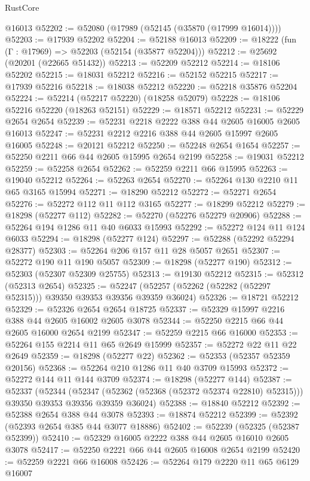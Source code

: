 \begin{lexlean}{RustCore}
\begin{coremodule}
    @16013
@52202 := @52080 (@17989 (@52145 (@35870 (@17999 @16014))))
@52203 := @17939 @52202
@52204 := @52188 @16013
@52209 := @18222 (fun (Γ : @17969) => @52203 (@52154 (@35877 @52204)))
@52212 := @25692 (@20201 (@22665 @51432))
@52213 := @52209 @52212
@52214 := @18106 @52202
@52215 := @18031 @52212
@52216 := @52152 @52215
@52217 := @17939 @52216
@52218 := @18038 @52212
@52220 := @52218 @35876 @52204
@52224 := @52214 (@52217 @52220) (@18258 @52079)
@52228 := @18106 @52216 @52220 (@18263 @52151)
@52229 := @18571 @52212
@52231 := @52229 @2654 @2654
@52239 := @52231 @2218 @2222 @388 @44 @2605 @16005 @2605 @16013
@52247 := @52231 @2212 @2216 @388 @44 @2605 @15997 @2605 @16005
@52248 := @20121 @52212
@52250 := @52248 @2654 @1654
@52257 := @52250 @2211 @66 @44 @2605 @15995 @2654 @2199
@52258 := @19031 @52212
@52259 := @52258 @2654
@52262 := @52259 @2211 @66 @15995
@52263 := @19040 @52212
@52264 := @52263 @2654
@52270 := @52264 @130 @2210 @11 @65 @3165 @15994
@52271 := @18290 @52212
@52272 := @52271 @2654
@52276 := @52272 @112 @11 @112 @3165
@52277 := @18299 @52212
@52279 := @18298 (@52277 @112)
@52282 := @52270 (@52276 @52279 @20906)
@52288 := @52264 @194 @1286 @11 @40 @6033 @15993
@52292 := @52272 @124 @11 @124 @6033
@52294 := @18298 (@52277 @124)
@52297 := @52288 (@52292 @52294 @28377)
@52303 := @52264 @206 @157 @11 @28 @5057 @2651
@52307 := @52272 @190 @11 @190 @5057
@52309 := @18298 (@52277 @190)
@52312 := @52303 (@52307 @52309 @25755)
@52313 := @19130 @52212
@52315 := @52312 (@52313 @2654)
@52325 := @52247 (@52257 (@52262 (@52282 (@52297 @52315))) @39350 @39353 @39356 @39359 @36024)
@52326 := @18721 @52212
@52329 := @52326 @2654 @2654 @18725
@52337 := @52329 @15997 @2216 @388 @44 @2605 @16002 @2605 @3078
@52344 := @52250 @2215 @66 @44 @2605 @16000 @2654 @2199
@52347 := @52259 @2215 @66 @16000
@52353 := @52264 @155 @2214 @11 @65 @2649 @15999
@52357 := @52272 @22 @11 @22 @2649
@52359 := @18298 (@52277 @22)
@52362 := @52353 (@52357 @52359 @20156)
@52368 := @52264 @210 @1286 @11 @40 @3709 @15993
@52372 := @52272 @144 @11 @144 @3709
@52374 := @18298 (@52277 @144)
@52387 := @52337
    (@52344
      (@52347 (@52362 (@52368 (@52372 @52374 @22810) @52315)))
      @39350
      @39353
      @39356
      @39359
      @36024)
@52388 := @18840 @52212
@52392 := @52388 @2654 @388 @44 @3078
@52393 := @18874 @52212
@52399 := @52392 (@52393 @2654 @385 @44 @3077 @18886)
@52402 := @52239 (@52325 (@52387 @52399))
@52410 := @52329 @16005 @2222 @388 @44 @2605 @16010 @2605 @3078
@52417 := @52250 @2221 @66 @44 @2605 @16008 @2654 @2199
@52420 := @52259 @2221 @66 @16008
@52426 := @52264 @179 @2220 @11 @65 @6129 @16007

\end{coremodule}
\end{lexlean}
